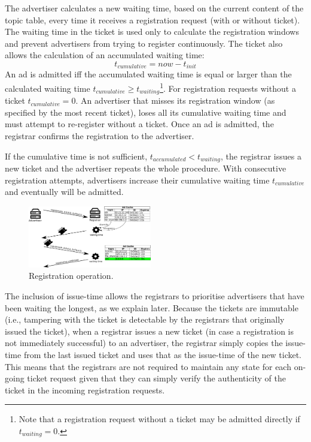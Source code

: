 The advertiser calculates a new waiting time, based on the current content of
the topic table, every time it receives a registration request (with or without
ticket). The waiting time in the ticket is used only to calculate the
registration windows and prevent advertisers from trying to register
continuously. The ticket also allows the calculation of an accumulated waiting time:
\begin{equation}
    t_\textit{cumulative} = \textit{now} - t_\textit{init}
\end{equation}
An ad is admitted iff the accumulated waiting time is equal or larger than the calculated waiting time $t_\textit{cumulative} \ge t_\textit{waiting}$\footnote{Note that a registration request without a ticket may be admitted directly if $t_\textit{waiting}=0$.}. For registration requests without a ticket $t_\textit{cumulative} = 0$. An advertiser that misses its registration window (as specified by the most recent ticket), loses all its cumulative waiting time and must attempt to re-register without a ticket. Once an ad is admitted, the registrar confirms the registration to the advertiser.

If the cumulative time is not sufficient, $t_\textit{accumulated} < t_\textit{waiting}$, the registrar issues a new ticket and the advertiser repeats the whole procedure. With consecutive registration attempts, advertisers increase their cumulative waiting time $t_\textit{cumulative}$ and eventually will be admitted. 


\begin{figure}
    \includegraphics[width=0.48\textwidth]{img/registration}
    \caption{Registration operation.}
    \label{fig:registration}
\end{figure}

The inclusion of issue-time allows the registrars to prioritise advertisers
that have been waiting the longest, as we explain later. Because the tickets
are immutable (i.e., tampering with the ticket is detectable by the registrars
that originally issued the ticket), when a registrar issues a new ticket (in
case a registration is not immediately successful) to an advertiser, the
registrar simply copies the issue-time from the last issued ticket and uses that as the issue-time of the new ticket. This means that the registrars are not required to maintain any state for each on-going ticket request given that they can simply verify the authenticity of the ticket in the incoming registration requests.



